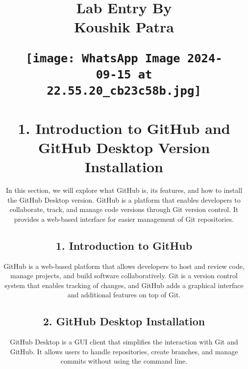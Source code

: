 \documentclass[a4paper,12pt]{article}
\begin{document}
\newpage
\usetikzlibrary{calc}

\title{Lab Entry By\\[0.5cm] \large Koushik Patra\\[0.5cm]
    \begin{figure}
    \centering
    \texttt{[image: WhatsApp Image 2024-09-15 at 22.55.20\_cb23c58b.jpg]} 
\end{figure}
\author{}
\date{}

\maketitle
\section*{1. Introduction to GitHub and GitHub Desktop Version Installation}

In this section, we will explore what GitHub is, its features, and how to install the GitHub Desktop version. GitHub is a platform that enables developers to collaborate, track, and manage code versions through Git version control. It provides a web-based interface for easier management of Git repositories.

\subsection*{1. Introduction to GitHub}
GitHub is a web-based platform that allows developers to host and review code, manage projects, and build software collaboratively. Git is a version control system that enables tracking of changes, and GitHub adds a graphical interface and additional features on top of Git.

\subsection*{2. GitHub Desktop Installation}
GitHub Desktop is a GUI client that simplifies the interaction with Git and GitHub. It allows users to handle repositories, create branches, and manage commits without using the command line.

}
\end{document}
